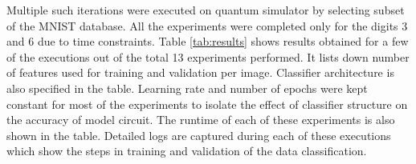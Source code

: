 \documentclass[english,a4paper,11pt,oneside,onecolumn]{book}
\begin{document}
Multiple such iterations were executed on quantum simulator by selecting subset of the MNIST database. All the experiments were completed only for the digits 3 and 6 due to time constraints. Table \ref{tab:results} shows results obtained for a few of the executions out of the total 13 experiments performed. It lists down number of features used for training and validation per image. Classifier architecture is also specified in the table. Learning rate and number of epochs were kept constant for most of the experiments to isolate the effect of classifier structure on the accuracy of model circuit. The runtime of each of these experiments is also shown in the table. Detailed logs are captured during each of these executions which show the steps in training and validation of the data classification.

\begin{table}[H]
\begin{center}
\end{center}
\end{table}
\end{document}
